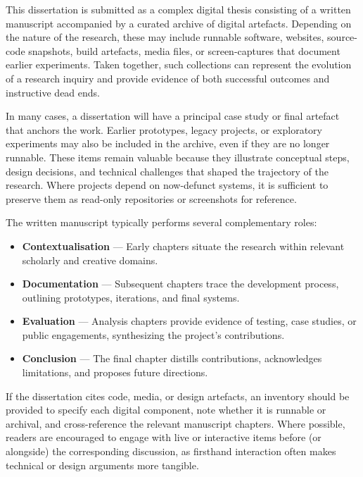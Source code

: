 \documentclass[12pt]{yorkudiss}
\begin{document}
\begin{preface}

This dissertation is submitted as a complex digital thesis consisting of a written manuscript accompanied by a curated archive of digital artefacts. Depending on the nature of the research, these may include runnable software, websites, source-code snapshots, build artefacts, media files, or screen-captures that document earlier experiments. Taken together, such collections can represent the evolution of a research inquiry and provide evidence of both successful outcomes and instructive dead ends.

In many cases, a dissertation will have a principal case study or final artefact that anchors the work. Earlier prototypes, legacy projects, or exploratory experiments may also be included in the archive, even if they are no longer runnable. These items remain valuable because they illustrate conceptual steps, design decisions, and technical challenges that shaped the trajectory of the research. Where projects depend on now-defunct systems, it is sufficient to preserve them as read-only repositories or screenshots for reference.

The written manuscript typically performs several complementary roles:

\begin{itemize}
    \item \textbf{Contextualisation} — Early chapters situate the research within relevant scholarly and creative domains. 
  
    \item \textbf{Documentation} — Subsequent chapters trace the development process, outlining prototypes, iterations, and final systems.

    \item \textbf{Evaluation} — Analysis chapters provide evidence of testing, case studies, or public engagements, synthesizing the project’s contributions.

    \item \textbf{Conclusion} — The final chapter distills contributions, acknowledges limitations, and proposes future directions.
\end{itemize}

If the dissertation cites code, media, or design artefacts, an inventory should be provided to specify each digital component, note whether it is runnable or archival, and cross-reference the relevant manuscript chapters. Where possible, readers are encouraged to engage with live or interactive items before (or alongside) the corresponding discussion, as firsthand interaction often makes technical or design arguments more tangible.


\end{preface}
\end{document}
